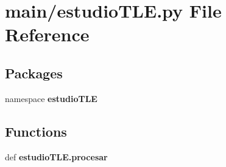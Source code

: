 \section{main/estudio\-T\-L\-E.py \-File \-Reference}
\label{estudio_t_l_e_8py}
\subsection*{\-Packages}
\begin{DoxyCompactItemize}
\item 
namespace {\bf estudio\-T\-L\-E}
\end{DoxyCompactItemize}
\subsection*{\-Functions}
\begin{DoxyCompactItemize}
\item 
def {\bf estudio\-T\-L\-E.\-procesar}
\end{DoxyCompactItemize}
